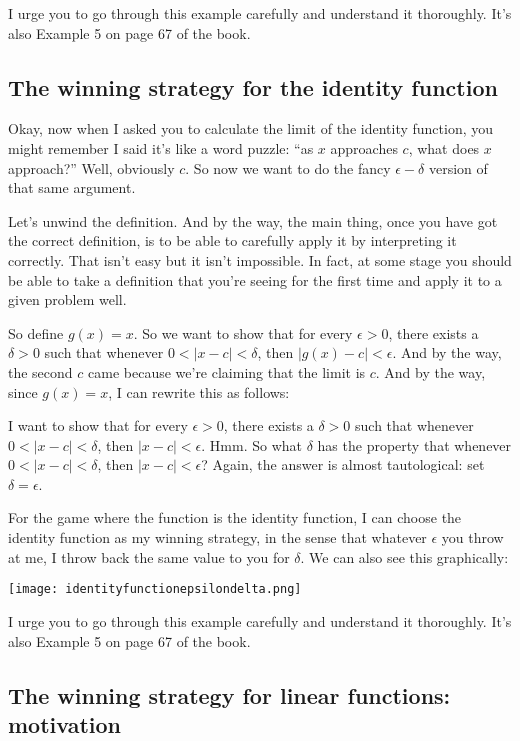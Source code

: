 \documentclass[10pt]{amsart}
\begin{document}
I urge you to go through this example carefully and understand it
thoroughly. It's also Example 5 on page 67 of the book.

\subsection{The winning strategy for the identity function}

Okay, now when I asked you to calculate the limit of the identity
function, you might remember I said it's like a word puzzle: ``as $x$
approaches $c$, what does $x$ approach?'' Well, obviously $c$. So now
we want to do the fancy $\epsilon-\delta$ version of that same
argument.

Let's unwind the definition. And by the way, the main thing, once you
have got the correct definition, is to be able to carefully apply it
by interpreting it correctly. That isn't easy but it isn't
impossible. In fact, at some stage you should be able to take a
definition that you're seeing for the first time and apply it to a
given problem well.

So define $g(x) = x$. So we want to show that for every $\epsilon >
0$, there exists a $\delta > 0$ such that whenever $0 < |x - c| <
\delta$, then $|g(x) - c| < \epsilon$. And by the way, the second $c$
came because we're claiming that the limit is $c$. And by the way,
since $g(x) = x$, I can rewrite this as follows:

I want to show that for every $\epsilon > 0$, there exists a $\delta >
0$ such that whenever $0 < |x - c| < \delta$, then $|x - c| <
\epsilon$. Hmm. So what $\delta$ has the property that whenever $0 <
|x - c| < \delta$, then $|x - c| < \epsilon$? Again, the answer is
almost tautological: set $\delta = \epsilon$.

For the game where the function is the identity function, I can
choose the identity function as my winning strategy, in the sense that
whatever $\epsilon$ you throw at me, I throw back the same value to
you for $\delta$. We can also see this graphically:

\texttt{[image: identityfunctionepsilondelta.png]}

I urge you to go through this example carefully and understand it
thoroughly. It's also Example 5 on page 67 of the book.

\subsection{The winning strategy for linear functions: motivation}
\end{document}

